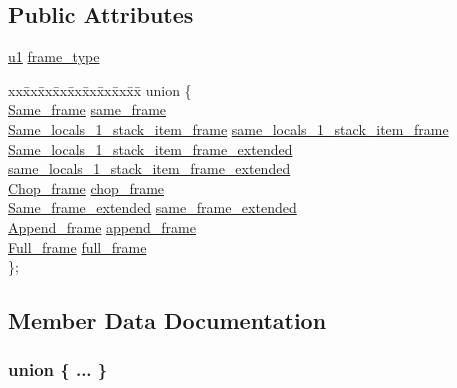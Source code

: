 \subsection*{Public Attributes}
\begin{DoxyCompactItemize}
\item 
\hyperlink{structures_8h_a64f8055b64cf2a4c299c841130c5c938}{u1} \hyperlink{structstack__map__frame_ae7d53e0f8daea6d5738a88ffb94e575c}{frame\+\_\+type}
\item 
\begin{tabbing}
xx\=xx\=xx\=xx\=xx\=xx\=xx\=xx\=xx\=\kill
union \{\\
\>\hyperlink{structSame__frame}{Same\_frame} \hyperlink{structstack__map__frame_a566369b2c76e233dc18856709be7d3dc}{same\_frame}\\
\>\hyperlink{structSame__locals__1__stack__item__frame}{Same\_locals\_1\_stack\_item\_frame} \hyperlink{structstack__map__frame_a4a73bdea158110c9c632ef657acdceed}{same\_locals\_1\_stack\_item\_frame}\\
\>\hyperlink{structSame__locals__1__stack__item__frame__extended}{Same\_locals\_1\_stack\_item\_frame\_extended} \hyperlink{structstack__map__frame_acb0262b85b6ddf629227b4e269107c4d}{same\_locals\_1\_stack\_item\_frame\_extended}\\
\>\hyperlink{structChop__frame}{Chop\_frame} \hyperlink{structstack__map__frame_a5240372d8b1af1775ee49050a515b9f2}{chop\_frame}\\
\>\hyperlink{structSame__frame__extended}{Same\_frame\_extended} \hyperlink{structstack__map__frame_a5fd4fb1c466520e7296b33ca512a844a}{same\_frame\_extended}\\
\>\hyperlink{structAppend__frame}{Append\_frame} \hyperlink{structstack__map__frame_ab412797c19922cdc0ac8fee59c59b49b}{append\_frame}\\
\>\hyperlink{structFull__frame}{Full\_frame} \hyperlink{structstack__map__frame_a6f51b3460b916cc6285c57efa37bf8e0}{full\_frame}\\
\}; \\

\end{tabbing}\end{DoxyCompactItemize}


\subsection{Member Data Documentation}
\subsubsection[{\texorpdfstring{"@23}{@23}}]{\setlength{\rightskip}{0pt plus 5cm}union \{ ... \} }\hypertarget{structstack__map__frame_a5c073aea2bad69d9058ef668105484da}{}\label{structstack__map__frame_a5c073aea2bad69d9058ef668105484da}

